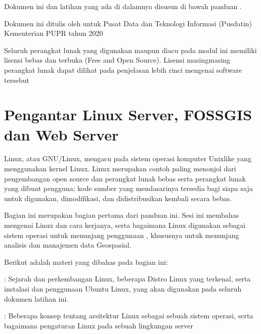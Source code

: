 \documentclass[letterpaper,10pt,english]{sphinxmanual}
\begin{document}

Dokumen ini dan latihan yang ada di dalamnya disusun di bawah panduan .

Dokumen ini ditulis oleh  untuk Pusat Data dan Teknologi Informasi (Pusdatin) Kementerian PUPR tahun 2020


Seluruh perangkat lunak yang digunakan maupun diacu pada modul ini memiliki lisensi bebas dan terbuka (Free and Open Source). Lisensi masing\sphinxhyphen{}masing perangkat lunak dapat dilihat pada penjelasan lebih rinci mengenai software tersebut


\chapter{Pengantar Linux Server, FOSS\sphinxhyphen{}GIS dan Web Server}
\label{\detokenize{sesi1/introlinux:pengantar-linux-server-foss-gis-dan-web-server}}\label{\detokenize{sesi1/introlinux::doc}}
Linux, atau GNU/Linux, mengacu pada sistem operasi komputer Unix\sphinxhyphen{}like yang menggunakan kernel Linux. Linux merupakan contoh paling menonjol dari pengembangan open source dan perangkat lunak bebas serta perangkat lunak yang dibuat pengguna; kode sumber yang mendasarinya tersedia bagi siapa saja untuk digunakan, dimodifikasi, dan didistribusikan kembali secara bebas.

Bagian ini merupakan bagian pertama dari panduan ini. Sesi ini membahas mengenai Linux dan cara kerjanya, serta bagaimana Linux digunakan sebagai sistem operasi untuk menunjang penggunaan , khususnya untuk menunjang analisis dan manajemen data Geospasial.

Berikut adalah materi yang dibahas pada bagian ini:

 {\hyperref[\detokenize{sesi1/pengantarlinux::doc}]{}}
: Sejarah dan perkembangan Linux, beberapa Distro Linux yang terkenal, serta instalasi dan penggunaan Ubuntu Linux, yang akan digunakan pada seluruh dokumen latihan ini.

 {\hyperref[\detokenize{sesi1/arsitektur::doc}]{}}
: Beberapa konsep tentang arsitektur Linux sebagai sebuah sistem operasi, serta bagaimana pengaturan Linux pada sebuah lingkungan server
\end{document}
